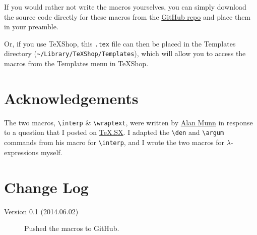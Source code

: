 \documentclass{article}
\newcommand{\interp}[2][]{
	\(
		\left\llbracket\,\text{#2}\,\right\rrbracket^{#1}
	\)
	}
\newcommand{\wraptext}[2][1in]{\begin{varwidth}{#1}{\RaggedRight#2}\end{varwidth}}
\newcommand{\den}[1]{
	\(
		\left[\,\text{#1}\,\right]
	\)
	}
\newcommand{\argum}[1]{
	\(
		\left(\,\text{#1}\,\right)
	\)
	}
\begin{document}
If you would rather not write the macros yourselves, you can simply download the source code directly for these macros from the \href{https://github.com/adamliter/lingsem}{GitHub repo} and place them in your preamble.

Or, if you use TeXShop, this \texttt{.tex} file can then be placed in the Templates directory (\verb|~/Library/TeXShop/Templates|), which will allow you to access the macros from the Templates menu in TeXShop.

\section{\label{sec:acknowledgements}Acknowledgements}

The two macros, \verb|\interp| \& \verb|\wraptext|, were written by \href{http://tex.stackexchange.com/users/2693/alan-munn}{Alan Munn} in response to a question that I posted on \href{http://tex.stackexchange.com/questions/121605/macro-for-typesetting-semantic-denotations-linguistics}{TeX.SX}. I adapted the \verb|\den| and \verb|\argum| commands from his macro for \verb|\interp|, and I wrote the two macros for $\lambda$-expressions myself.

\section{\label{sec:changes}Change Log}

\begin{description}

\item[Version 0.1 (2014.06.02)]{Pushed the macros to GitHub.}

\end{description}


\end{document}
